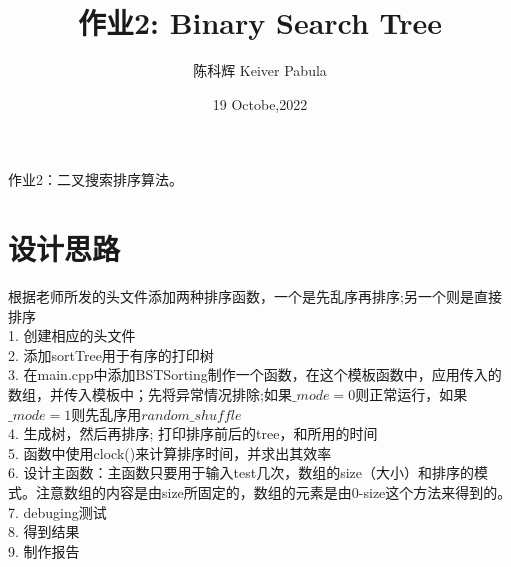 \documentclass{ctexart}
\title{作业2: Binary Search Tree}
\author{陈科辉 Keiver Pabula}
\date{19 Octobe,2022}
\begin{document}
\maketitle

作业2：二叉搜索排序算法。
\section{设计思路}
根据老师所发的头文件添加两种排序函数，一个是先乱序再排序;另一个则是直接排序\\
1. 创建相应的头文件\\
2. 添加sortTree用于有序的打印树\\
3. 在main.cpp中添加BSTSorting制作一个函数，在这个模板函数中，应用传入的数组，并传入模板中；先将异常情况排除;如果$\_mode=0$则正常运行，如果$\_mode=1$则先乱序用$random\_shuffle$\\
4. 生成树，然后再排序; 打印排序前后的tree，和所用的时间\\
5. 函数中使用clock()来计算排序时间，并求出其效率\\
6. 设计主函数：主函数只要用于输入test几次，数组的size（大小）和排序的模式。注意数组的内容是由size所固定的，数组的元素是由0-size这个方法来得到的。\\
7. debuging测试\\
8. 得到结果\\
9. 制作报告\\
\end{document}
